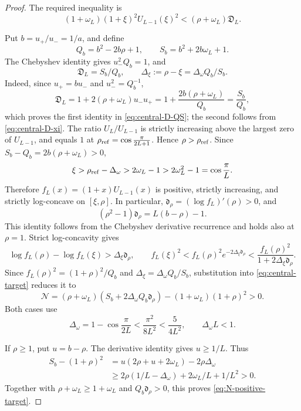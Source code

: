 \documentclass[preprints,article,accept,oneauthor]{Definitions/mdpi}
\numberwithin{equation}{section}
\theoremstyle{mdpi}
\theoremstyle{definition}
\begin{document}
\begin{proof}
The required inequality is
\begin{equation}\label{eq:central-target}
 (1+\omega_L)(1+\xi)^2U_{L-1}(\xi)^2
 <(\rho+\omega_L)\mathfrak D_L.
\end{equation}

Put \(b=u_+/u_-=1/a\), and define
\[
 Q_b=b^2-2b\rho+1,\qquad S_b=b^2+2b\omega_L+1.
\]
The Chebyshev identity gives \(u_-^2Q_b=1\), and
\begin{equation}\label{eq:central-D-QS}
 \mathfrak D_L=S_b/Q_b,\qquad
 \Delta_\xi:=\rho-\xi=\Delta_\omega Q_b/S_b.
\end{equation}
Indeed, since \(u_+=bu_-\) and \(u_-^2=Q_b^{-1}\),
\[
 \mathfrak D_L=1+2(\rho+\omega_L)u_-u_+
  =1+\frac{2b(\rho+\omega_L)}{Q_b}=\frac{S_b}{Q_b},
\]
which proves the first identity in \eqref{eq:central-D-QS}; the second
follows from
\eqref{eq:central-D-xi}.
The ratio \(U_L/U_{L-1}\) is strictly increasing above the largest zero
of \(U_{L-1}\), and equals \(1\) at
\(\rho_{\rm ref}=\cos\frac{\pi}{2L+1}\).  Hence
\(\rho>\rho_{\rm ref}\).  Since
\(S_b-Q_b=2b(\rho+\omega_L)>0\),
\[
 \xi>\rho_{\rm ref}-\Delta_\omega>2\omega_L-1
 >2\omega_L^2-1=\cos\frac{\pi}{L}.
\]
Therefore \(f_L(x)=(1+x)U_{L-1}(x)\) is positive, strictly increasing,
and strictly log-concave on \([\xi,\rho]\).  In particular,
\(\mathfrak d_\rho=(\log f_L)'(\rho)>0\), and
\[
 (\rho^2-1)\mathfrak d_\rho=L(b-\rho)-1.
\]
This identity follows from the Chebyshev derivative recurrence and holds
also at \(\rho=1\).  Strict log-concavity gives
\[
 \log f_L(\rho)-\log f_L(\xi)>\Delta_\xi\mathfrak d_\rho,
 \qquad
 f_L(\xi)^2<f_L(\rho)^2e^{-2\Delta_\xi\mathfrak d_\rho}
 <\frac{f_L(\rho)^2}{1+2\Delta_\xi\mathfrak d_\rho}.
\]
Since
\(f_L(\rho)^2=(1+\rho)^2/Q_b\) and
\(\Delta_\xi=\Delta_\omega Q_b/S_b\), substitution into
\eqref{eq:central-target} reduces it to
\begin{equation}\label{eq:N-positive-target}
 \mathcal N=(\rho+\omega_L)
 (S_b+2\Delta_\omega Q_b\mathfrak d_\rho)
 -(1+\omega_L)(1+\rho)^2>0.
\end{equation}
Both cases use
\begin{equation}\label{eq:Delta-omega-basic-bound}
 \Delta_\omega=1-\cos\frac{\pi}{2L}
 <\frac{\pi^2}{8L^2}<\frac5{4L^2},
 \qquad \Delta_\omega L<1.
\end{equation}

If \(\rho\geq1\), put \(u=b-\rho\).  The derivative identity gives
\(u\geq1/L\).  Thus
\[
 \begin{aligned}
 S_b-(1+\rho)^2
 &=u(2\rho+u+2\omega_L)-2\rho\Delta_\omega\\
 &\geq2\rho(1/L-\Delta_\omega)+2\omega_L/L+1/L^2>0.
 \end{aligned}
\]
Together with \(\rho+\omega_L\geq1+\omega_L\) and
\(Q_b\mathfrak d_\rho>0\), this proves \eqref{eq:N-positive-target}.


\end{proof}
\end{document}
